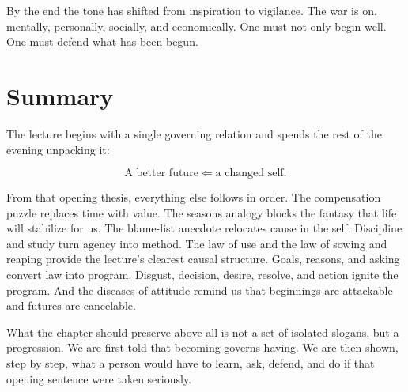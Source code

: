 By the end the tone has shifted from inspiration to vigilance. The war is on, mentally, personally, socially, and economically. One must not only begin well. One must defend what has been begun.

\section{Summary}

The lecture begins with a single governing relation and spends the rest of the evening unpacking it:

\begin{equation}
\text{A better future} \Longleftarrow \text{a changed self}.
\end{equation}

From that opening thesis, everything else follows in order. The compensation puzzle replaces time with value. The seasons analogy blocks the fantasy that life will stabilize for us. The blame-list anecdote relocates cause in the self. Discipline and study turn agency into method. The law of use and the law of sowing and reaping provide the lecture's clearest causal structure. Goals, reasons, and asking convert law into program. Disgust, decision, desire, resolve, and action ignite the program. And the diseases of attitude remind us that beginnings are attackable and futures are cancelable.

What the chapter should preserve above all is not a set of isolated slogans, but a progression. We are first told that becoming governs having. We are then shown, step by step, what a person would have to learn, ask, defend, and do if that opening sentence were taken seriously.